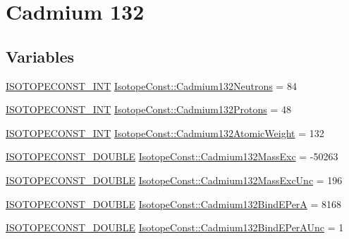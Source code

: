 \hypertarget{group___isotope_const-_cadmium-_cd132}{}\section{Cadmium 132}
\label{group___isotope_const-_cadmium-_cd132}
\subsection*{Variables}
\begin{DoxyCompactItemize}
\item 
\mbox{\hyperlink{group___isotope_const-_macros_ga5f18360b3e99483a35c32d789e62621c}{I\+S\+O\+T\+O\+P\+E\+C\+O\+N\+S\+T\+\_\+\+I\+NT}} \mbox{\hyperlink{group___isotope_const-_cadmium-_cd132_gaab1448e10e47a76259916f9aff833f4e}{Isotope\+Const\+::\+Cadmium132\+Neutrons}} = 84
\item 
\mbox{\hyperlink{group___isotope_const-_macros_ga5f18360b3e99483a35c32d789e62621c}{I\+S\+O\+T\+O\+P\+E\+C\+O\+N\+S\+T\+\_\+\+I\+NT}} \mbox{\hyperlink{group___isotope_const-_cadmium-_cd132_ga712fabee8538dc2a572361d2f995a6b7}{Isotope\+Const\+::\+Cadmium132\+Protons}} = 48
\item 
\mbox{\hyperlink{group___isotope_const-_macros_ga5f18360b3e99483a35c32d789e62621c}{I\+S\+O\+T\+O\+P\+E\+C\+O\+N\+S\+T\+\_\+\+I\+NT}} \mbox{\hyperlink{group___isotope_const-_cadmium-_cd132_gadde65c0b377624d2288e742b73a07a87}{Isotope\+Const\+::\+Cadmium132\+Atomic\+Weight}} = 132
\item 
\mbox{\hyperlink{group___isotope_const-_macros_ga8f45a7272ce02c0b4c65c44636ed719a}{I\+S\+O\+T\+O\+P\+E\+C\+O\+N\+S\+T\+\_\+\+D\+O\+U\+B\+LE}} \mbox{\hyperlink{group___isotope_const-_cadmium-_cd132_ga919cecb5a584605c5192cadd07b30a93}{Isotope\+Const\+::\+Cadmium132\+Mass\+Exc}} = -\/50263
\item 
\mbox{\hyperlink{group___isotope_const-_macros_ga8f45a7272ce02c0b4c65c44636ed719a}{I\+S\+O\+T\+O\+P\+E\+C\+O\+N\+S\+T\+\_\+\+D\+O\+U\+B\+LE}} \mbox{\hyperlink{group___isotope_const-_cadmium-_cd132_ga438278ac2853c0679391ef9291eecae3}{Isotope\+Const\+::\+Cadmium132\+Mass\+Exc\+Unc}} = 196
\item 
\mbox{\hyperlink{group___isotope_const-_macros_ga8f45a7272ce02c0b4c65c44636ed719a}{I\+S\+O\+T\+O\+P\+E\+C\+O\+N\+S\+T\+\_\+\+D\+O\+U\+B\+LE}} \mbox{\hyperlink{group___isotope_const-_cadmium-_cd132_ga80f0043df5c6c5b03188a417e571ceb9}{Isotope\+Const\+::\+Cadmium132\+Bind\+E\+PerA}} = 8168
\item 
\mbox{\hyperlink{group___isotope_const-_macros_ga8f45a7272ce02c0b4c65c44636ed719a}{I\+S\+O\+T\+O\+P\+E\+C\+O\+N\+S\+T\+\_\+\+D\+O\+U\+B\+LE}} \mbox{\hyperlink{group___isotope_const-_cadmium-_cd132_ga186c629f53289edd402fba4b5c00143d}{Isotope\+Const\+::\+Cadmium132\+Bind\+E\+Per\+A\+Unc}} = 1

\end{DoxyCompactItemize}
